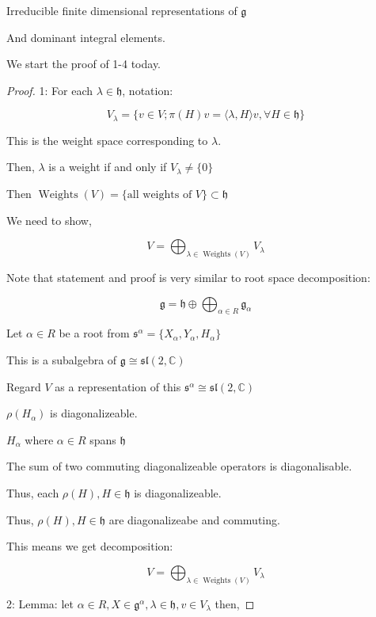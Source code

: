 \documentclass{article}
\theoremstyle{definition}
\begin{document}
Irreducible finite dimensional representations of \(\mathfrak{g} \) 

And dominant integral elements.

We start the proof of 1-4 today.

\begin{proof}
    1: For each \(\lambda \in \mathfrak{h}\), notation:

    \[
        V_\lambda = \{ v\in V; \pi (H)v = \langle \lambda , H \rangle v, \forall H\in \mathfrak{h} \} 
    \]

    This is the weight space corresponding to \(\lambda\).

    Then, \(\lambda\) is a weight if and only if \(V_\lambda \neq \{ 0 \} \) 

    Then \(\operatorname{Weights}(V) = \{ \text{all weights of } V \} \subset \mathfrak{h} \) 

    We need to show,

    \[
        V = \bigoplus_{\lambda\in \operatorname{Weights}(V)}^{} V_\lambda
    \]

    Note that statement and proof is very similar to root space decomposition:

    \[
        \mathfrak{g} = \mathfrak{h} \oplus \bigoplus_{\alpha \in R}^{} \mathfrak{g} _\alpha 
    \]

    Let \(\alpha \in R\) be a root from \(\mathfrak{s}^\alpha = \{ X_\alpha , Y_\alpha , H_\alpha \} \) 

    This is a subalgebra of \(\mathfrak{g} \cong \mathfrak{sl} (2,\mathbb{C})\) 

    Regard \(V\) as a representation of this \(\mathfrak{s} ^\alpha \cong \mathfrak{sl} (2,\mathbb{C})\) 

    \(\rho(H_\alpha)\) is diagonalizeable.

    \(H_\alpha\) where \(\alpha \in R\) spans \(\mathfrak{h}\) 

    The sum of two commuting diagonalizeable operators is diagonalisable.

    Thus, each \(\rho (H),H\in \mathfrak{h}\) is diagonalizeable.

    Thus, \(\rho(H), H\in \mathfrak{h}\) are diagonalizeabe and commuting.

    This means we get decomposition:

    \[
        V = \bigoplus_{\lambda \in \operatorname{Weights}(V)} V_\lambda    
    \]

    2: Lemma: let \(\alpha \in R, X\in \mathfrak{g} ^\alpha , \lambda \in \mathfrak{h} , v\in V_\lambda\) then,


\end{proof}
\end{document}
